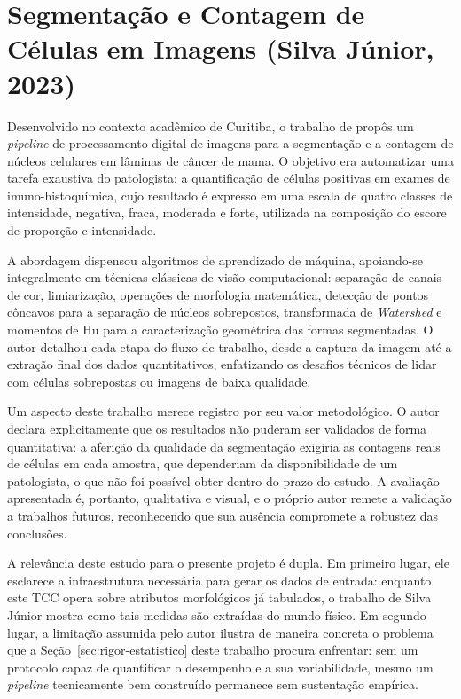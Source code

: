 \documentclass[
    12pt
    ,oneside
    ,a4paper
    ,chapter=TITLE
    ,section=TITLE
    ,sumario=abnt-6027-2012
    ,english,brazil]{abntex2} %
\begin{document}
\section{Segmentação e Contagem de Células em Imagens (Silva Júnior, 2023)}

Desenvolvido no contexto acadêmico de Curitiba, o trabalho de  propôs um \textit{pipeline} de processamento digital de imagens para a segmentação e a contagem de núcleos celulares em lâminas de câncer de mama. O objetivo era automatizar uma tarefa exaustiva do patologista: a quantificação de células positivas em exames de imuno-histoquímica, cujo resultado é expresso em uma escala de quatro classes de intensidade, negativa, fraca, moderada e forte, utilizada na composição do escore de proporção e intensidade.

A abordagem dispensou algoritmos de aprendizado de máquina, apoiando-se integralmente em técnicas clássicas de visão computacional: separação de canais de cor, limiarização, operações de morfologia matemática, detecção de pontos côncavos para a separação de núcleos sobrepostos, transformada de \textit{Watershed} e momentos de Hu para a caracterização geométrica das formas segmentadas. O autor detalhou cada etapa do fluxo de trabalho, desde a captura da imagem até a extração final dos dados quantitativos, enfatizando os desafios técnicos de lidar com células sobrepostas ou imagens de baixa qualidade.

Um aspecto deste trabalho merece registro por seu valor metodológico. O autor declara explicitamente que os resultados não puderam ser validados de forma quantitativa: a aferição da qualidade da segmentação exigiria as contagens reais de células em cada amostra, que dependeriam da disponibilidade de um patologista, o que não foi possível obter dentro do prazo do estudo. A avaliação apresentada é, portanto, qualitativa e visual, e o próprio autor remete a validação a trabalhos futuros, reconhecendo que sua ausência compromete a robustez das conclusões.

A relevância deste estudo para o presente projeto é dupla. Em primeiro lugar, ele esclarece a infraestrutura necessária para gerar os dados de entrada: enquanto este TCC opera sobre atributos morfológicos já tabulados, o trabalho de Silva Júnior mostra como tais medidas são extraídas do mundo físico. Em segundo lugar, a limitação assumida pelo autor ilustra de maneira concreta o problema que a Seção~\ref{sec:rigor-estatistico} deste trabalho procura enfrentar: sem um protocolo capaz de quantificar o desempenho e a sua variabilidade, mesmo um \textit{pipeline} tecnicamente bem construído permanece sem sustentação empírica.
\end{document}
